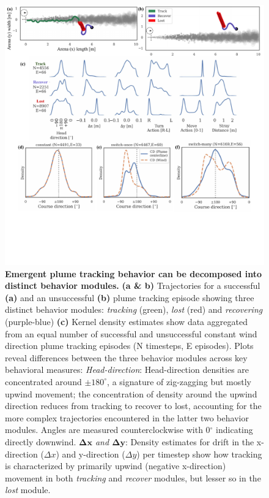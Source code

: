 \documentclass[5p,twocolumn,authoryear]{elsarticle}
\begin{document}
\begin{figure}[h!]
\begin{center}
\includegraphics[width=1.0\linewidth]{fig_regimes_coursedir.pdf} 
\caption{
\textbf{Emergent plume tracking behavior can be decomposed into distinct behavior modules.}
\textbf{(a \& b)} 
Trajectories for a successful \textbf{(a)} and an unsuccessful \textbf{(b)}
plume tracking episode showing three distinct behavior modules: \textit{tracking} (green), \textit{lost} (red) and \textit{recovering} (purple-blue)
\textbf{(c)}
Kernel density estimates show data aggregated from an equal number of successful and unsuccessful constant wind direction plume tracking episodes (N timesteps, E episodes). 
Plots reveal differences between the three behavior modules across key behavioral measures:
\textit{Head-direction}: 
Head-direction densities are concentrated around $\pm 180^{\circ}$, a signature of zig-zagging but mostly upwind movement; 
the concentration of density around the upwind direction reduces from tracking to recover to lost, accounting for the more complex trajectories encountered in the latter two behavior modules.
Angles are measured counterclockwise with 0$^{\circ}$ indicating directly downwind.
\textit{$\mathbf{\Delta x}$ and $\mathbf{\Delta y}$}: Density estimates for drift in the x-direction ($\Delta x$) and y-direction ($\Delta y$) per timestep show how tracking is characterized by primarily upwind (negative x-direction) movement in both \textit{tracking} and \textit{recover} modules, but lesser so in the \textit{lost} module.
}
\end{center}
\end{figure}
\end{document}
